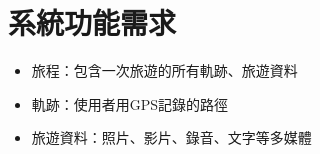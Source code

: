 \section{系統功能需求}

\begin{itemize}
  \item 旅程：包含一次旅遊的所有軌跡、旅遊資料
  \item 軌跡：使用者用GPS記錄的路徑
  \item 旅遊資料：照片、影片、錄音、文字等多媒體
\end{itemize}











% 